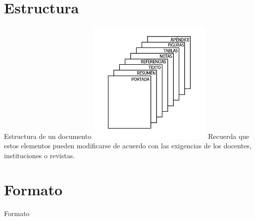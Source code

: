 \documentclass[
11pt, %
]{beamer}
\begin{document}
\section{Estructura}
\begin{frame}{Estructura de un documento}
	\centering
	\includegraphics[width=6cm]{figura01 normas apa estructura.png}
	{\color{blue} Recuerda que estos elementos pueden modificarse de acuerdo con las exigencias de los docentes, instituciones o revistas.}
\end{frame}

\section{Formato}
\begin{frame}{Formato}

\end{frame}

\end{document}

